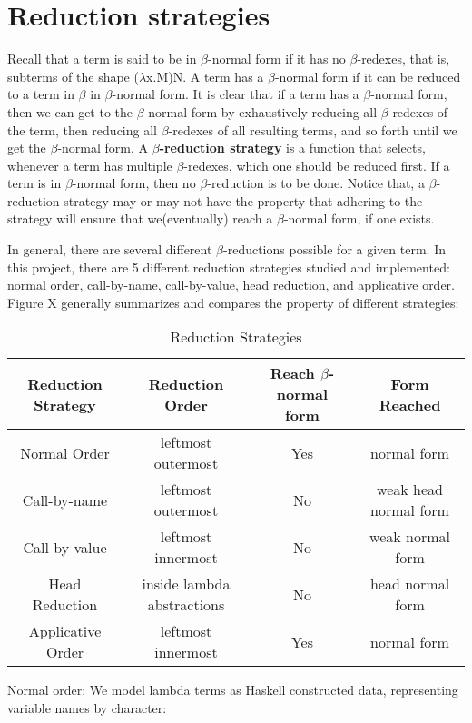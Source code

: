 \documentclass[a4paper,11pt,twoside]{report}
\begin{document}
\section{Reduction strategies}
\noindent Recall that a term is said to be in $\beta$-normal form if it has no $\beta$-redexes, that is, subterms of the shape ($\lambda$x.M)N. A term has a $\beta$-normal form if it can be reduced to a term in $\beta$ in $\beta$-normal form. It is clear that if a term has a $\beta$-normal form, then we can get to the $\beta$-normal form by exhaustively reducing all $\beta$-redexes of the term, then reducing all $\beta$-redexes of all resulting terms, and so forth until we get the $\beta$-normal form. A \textbf{$\beta$-reduction strategy} is a function that selects, whenever a term has multiple $\beta$-redexes, which one should be reduced first. If a term is in $\beta$-normal form, then no $\beta$-reduction is to be done. Notice that, a $\beta$-reduction strategy may or may not have the property that adhering to the strategy will ensure that we(eventually) reach a $\beta$-normal form, if one exists. 

In general, there are several different $\beta$-reductions possible for a given term. In this project, there are 5 different reduction strategies studied and implemented: normal order, call-by-name, call-by-value, head reduction, and applicative order. Figure X generally summarizes and compares the property of different strategies:
 
\begin{center}
\begin{table}[ht!]
\begin{tabular}{|c|c|c|c|}\hline
Reduction Strategy & Reduction Order & Reach $\beta$-normal form & Form Reached\\ \hline
Normal Order & leftmost outermost & Yes & normal form\\ \hline
Call-by-name & leftmost outermost & No  & weak head normal form\\ \hline
Call-by-value & leftmost innermost & No & weak normal form\\ \hline
Head Reduction & inside lambda abstractions & No & head normal form\\ \hline
Applicative Order & leftmost innermost & Yes & normal form\\ \hline
\end{tabular}
\caption{Reduction Strategies}
\end{table}
\end{center}
Normal order:
We model lambda terms as Haskell constructed data, representing variable names by character:
\end{document}
